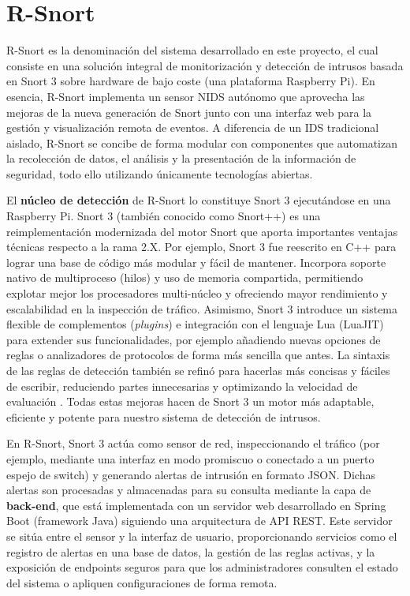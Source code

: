 \documentclass[11pt,a4paper,twoside]{report}
\begin{document}
\section{R-Snort}

R-Snort es la denominación del sistema desarrollado en este proyecto, el cual consiste en una solución integral de monitorización y detección de intrusos basada en Snort 3 sobre hardware de bajo coste (una plataforma Raspberry Pi). En esencia, R-Snort implementa un sensor NIDS autónomo que aprovecha las mejoras de la nueva generación de Snort junto con una interfaz web para la gestión y visualización remota de eventos. A diferencia de un IDS tradicional aislado, R-Snort se concibe de forma modular con componentes que automatizan la recolección de datos, el análisis y la presentación de la información de seguridad, todo ello utilizando únicamente tecnologías abiertas.\newline

El \textbf{núcleo de detección} de R-Snort lo constituye Snort 3 ejecutándose en una Raspberry Pi. Snort 3 (también conocido como Snort++) es una reimplementación modernizada del motor Snort que aporta importantes ventajas técnicas respecto a la rama 2.X. Por ejemplo, Snort 3 fue reescrito en C++ para lograr una base de código más modular y fácil de mantener. Incorpora soporte nativo de multiproceso (hilos) y uso de memoria compartida, permitiendo explotar mejor los procesadores multi-núcleo y ofreciendo mayor rendimiento y escalabilidad en la inspección de tráfico. Asimismo, Snort 3 introduce un sistema flexible de complementos (\textit{plugins}) e integración con el lenguaje Lua (LuaJIT) para extender sus funcionalidades, por ejemplo añadiendo nuevas opciones de reglas o analizadores de protocolos de forma más sencilla que antes. La sintaxis de las reglas de detección también se refinó para hacerlas más concisas y fáciles de escribir, reduciendo partes innecesarias y optimizando la velocidad de evaluación \cite{Sakura2020}. Todas estas mejoras hacen de Snort 3 un motor más adaptable, eficiente y potente para nuestro sistema de detección de intrusos.\newline

En R-Snort, Snort 3 actúa como sensor de red, inspeccionando el tráfico (por ejemplo, mediante una interfaz en modo promiscuo o conectado a un puerto espejo de switch) y generando alertas de intrusión en formato JSON. Dichas alertas son procesadas y almacenadas para su consulta mediante la capa de \textbf{back-end}, que está implementada con un servidor web desarrollado en Spring Boot (framework Java) siguiendo una arquitectura de API REST. Este servidor se sitúa entre el sensor y la interfaz de usuario, proporcionando servicios como el registro de alertas en una base de datos, la gestión de las reglas activas, y la exposición de endpoints seguros para que los administradores consulten el estado del sistema o apliquen configuraciones de forma remota.\newline
\end{document}
